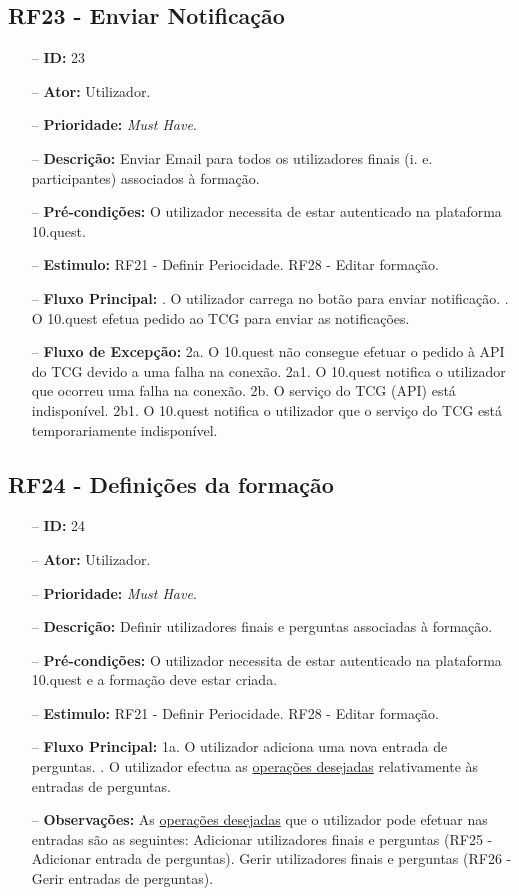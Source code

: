 \subsection{RF23 - Enviar Notificação}
\begin{itemize}
	\item[--] \textbf{ID:} 23
	\item[--]  \textbf{Ator:} Utilizador.
	\item[--]  \textbf{Prioridade:} \textit{Must Have}.
	\item[--]  \textbf{Descrição:} Enviar Email para todos os utilizadores finais (i. e. participantes) associados à formação.
	\item[--]  \textbf{Pré-condições:} O utilizador necessita de estar autenticado na plataforma 10.quest.
	\item[--]  \textbf{Estimulo:}
		\subitem RF21 - Definir Periocidade.
		\subitem RF28 - Editar formação.
	\item[--]  \textbf{Fluxo Principal:} 
		. O utilizador carrega no botão para enviar notificação.
		. O 10.quest efetua pedido ao TCG para enviar as notificações.
	\item[--]  \textbf{Fluxo de Excepção:} 
		\subitem 2a. O 10.quest não consegue efetuar o pedido à API do TCG devido a uma falha na conexão.
		\subitem 2a1. O 10.quest notifica o utilizador que ocorreu uma falha na conexão.
		\subitem 2b. O serviço do TCG (API) está indisponível.
		\subitem 2b1. O 10.quest notifica o utilizador que o serviço do TCG está temporariamente indisponível. 
\end{itemize}
\newpage

\subsection{RF24 - Definições da formação}
\begin{itemize}
	\item[--] \textbf{ID:} 24
	\item[--]  \textbf{Ator:} Utilizador.
	\item[--]  \textbf{Prioridade:} \textit{Must Have}.
	\item[--]  \textbf{Descrição:} Definir utilizadores finais e perguntas associadas à formação.
	\item[--]  \textbf{Pré-condições:} O utilizador necessita de estar autenticado na plataforma 10.quest e a formação deve estar criada.
	\item[--]  \textbf{Estimulo:}
	\subitem RF21 - Definir Periocidade.
	\subitem RF28 - Editar formação.
	\item[--]  \textbf{Fluxo Principal:} 
	\subitem 1a. O utilizador adiciona uma nova entrada de perguntas.
	. O utilizador efectua as \underline{operações desejadas} relativamente às entradas de perguntas.
	\item[--]  \textbf{Observações:} As \underline{operações desejadas} que o utilizador pode efetuar nas entradas são as seguintes:
		\subitem Adicionar utilizadores finais e perguntas (RF25 - Adicionar entrada de perguntas).
		\subitem Gerir utilizadores finais e perguntas (RF26 - Gerir entradas de perguntas).
\end{itemize}
\newpage

